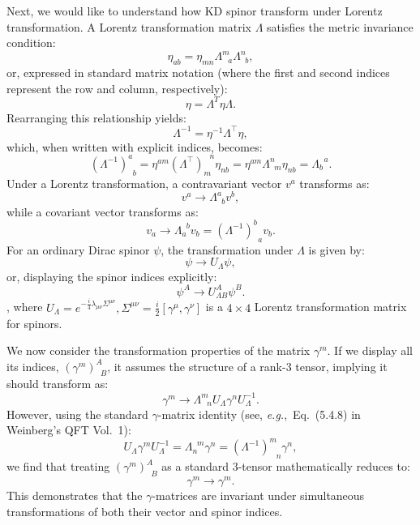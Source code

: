 Next, we would like to understand how KD spinor transform under Lorentz transformation.
A Lorentz transformation matrix $\Lambda$ satisfies the metric invariance condition:
\begin{equation}
  \eta_{ab}=\eta_{mn}\Lambda^{m}_{\;\;\,a}\Lambda^{n}_{\;\;b},
\end{equation}
or, expressed in standard matrix notation (where the first and second indices represent the row and column, respectively):
\begin{equation}
  \eta=\Lambda^{T}\eta \Lambda.
\end{equation}
Rearranging this relationship yields:
\begin{equation}
  \Lambda^{-1}=\eta^{-1}\Lambda^{\top}\eta,
\end{equation}
which, when written with explicit indices, becomes:
\begin{equation}
  (\Lambda^{-1})^{a}_{\;\;b}=\eta^{a m}(\Lambda^{\top})_{m}^{\;\;\,n}\eta_{n b} 
  =\eta^{a m}\Lambda^{n}_{\;\;m}\eta_{n b}  =\Lambda_{b}^{\;\;a}.
\end{equation}
Under a Lorentz transformation, a contravariant vector $v^{a}$ transforms as:
\begin{equation}
  v^{a}\to \Lambda^{a}_{\;\;b}v^{b},
\end{equation}
while a covariant vector transforms as:
\begin{equation}
  v_{a}\to \Lambda_{a}^{\;\;b}v_{b}=(\Lambda^{-1})^{b}_{\;\;a}v_{b}.
\end{equation}
For an ordinary Dirac spinor $\psi$, the transformation under $\Lambda$ is given by:
\begin{equation}
  \psi\to U_{\Lambda}\psi,
\end{equation}
or, displaying the spinor indices explicitly:
\begin{equation}
  \psi^{A}\to U^{A}_{\Lambda B}\psi^{B}.
\end{equation}
, where $U_{\Lambda}=e^{-\frac{i}{4}\lambda_{\mu\nu}\Sigma^{\mu\nu}}, \Sigma^{\mu\nu}=\frac{i}{2}[\gamma^\mu,\gamma^\nu]$ is a $4\times 4$ Lorentz transformation matrix for spinors.

We now consider the transformation properties of the matrix $\gamma^{m}$. If we display all its indices, $(\gamma^{m})^{A}_{\;\;B}$, it assumes the structure of a rank-3 tensor, implying it should transform as:
\begin{equation}
  \gamma^{m}\to \Lambda^{m}_{\;\;\,n} U_{\Lambda}\gamma^{n}U_{\Lambda}^{-1}.
\end{equation}
However, using the standard $\gamma$-matrix identity (see, {\it e.g.},\ Eq.~(5.4.8) in Weinberg's QFT Vol.~1): 
\begin{equation}
  \label{eq:gamma_Lorentz}
  U_{\Lambda}\gamma^{m}U_{\Lambda}^{-1}=\Lambda_{n}^{\;\;m}\gamma^{n}=(\Lambda^{-1})^{m}_{\;\;\;n}\gamma^{n},
\end{equation}
we find that treating $(\gamma^{m})^{A}_{\;\;B}$ as a standard 3-tensor mathematically reduces to:
\begin{equation}
  \gamma^{m}\to\gamma^{m}.
\end{equation}
This demonstrates that the $\gamma$-matrices are invariant under simultaneous transformations of both their vector and spinor indices.

